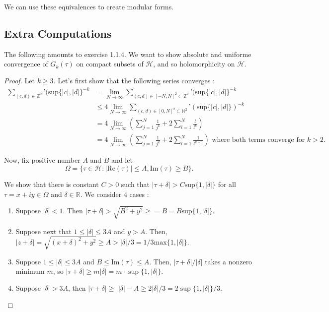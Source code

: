 \documentclass[11pt]{article}
\theoremstyle{plain}
\theoremstyle{definition}
\theoremstyle{example}
\theoremstyle{remark}
\theoremstyle{lemma}
\theoremstyle{proposition}
\theoremstyle{Problem}
\theoremstyle{Solution}
\theoremstyle{theorem}
\theoremstyle{corollary}
\begin{document}
We can use these equivalences to create modular forms.


\subsection{Extra Computations}
The following amounts to exercise 1.1.4.
We want to show absolute and uniforme convergence of $G_k(\tau)$ on compact subsets of $\mathcal{H}$, and so holomorphicity on $\mathcal{H}$. 
\begin{proof}
Let $k\geq 3$. Let’s first show that the following series converges :
\begin{align*}
\sum_{(c,d)\in\mathbb{Z}^2}’(\mathrm{sup}\{|c|,|d|\}^{-k}&=\lim_{N\to\infty} \sum_{(c,d)\in [-N,N]^2\subset \mathbb Z^2}’(\mathrm{sup}\{|c|,|d|\}^{-k}\\
&\leq 4 \lim_{N\to \infty} \sum_{(c,d)\in [0,N]^2\subset \mathbb{N}^2}’(\mathrm{sup}\{|c|,|d|\})^{-k}\\
&=4\lim_{N\to \infty} (\sum_{j=1}^{N} \frac{1}{j^k}+2\sum_{l=1}^N \frac{l}{l^k})\\
&=4\lim_{N\to \infty} (\sum_{j=1}^{N} \frac{1}{j^k}+2\sum_{l=1}^N \frac{1}{l^{k-1}}) \text{ where both terms converge for }k>2. 
\end{align*}

Now, fix positive number $A$ and $B$ and let $$\Omega=\{ \tau \in \mathcal H : |\mathrm{Re}(\tau)|\leq A, \mathrm{Im}(\tau) \geq B\}.$$

We show that there is constant $C>0$ such that $|\tau+\delta|>C\mathrm{sup}\{ 1, |\delta |\}$ for all $\tau=x+iy \in \Omega$ and $\delta \in \mathbb R$. We consider 4 cases : 
\begin{enumerate}
\item Suppose $|\delta| <1$. Then $|\tau+\delta|>\sqrt{B^2+y^2}\geq = B=B\mathrm{sup}\{ 1, |\delta |\}$.

\item Suppose next that $1 \leq |\delta| \leq 3 A$ and $y>A$. Then, $|z+\delta| = \sqrt{(x+\delta)^2+y^2}\geq A > |\delta|/3 = 1/3 \mathrm{max}\{1, |\delta|\}.$

\item Suppose $1 \leq|\delta| \leq 3 A$ and $B \leq \mathrm{Im}(\tau) \leq A$. Then, $|\tau+\delta| /|\delta|$ takes a nonzero minimum $m$, so $|\tau+\delta| \geq m|\delta|=m \cdot \sup \{1,|\delta|\}$. 

\item Suppose $|\delta|>3 A$, then $|\tau+\delta| \geq$ $|\delta|-A \geq 2|\delta| / 3=2 \sup \{1,|\delta|\} / 3$. 


\end{enumerate}
\end{proof}
\end{document}
